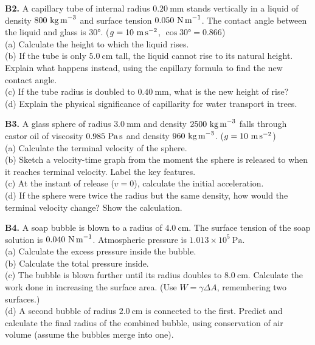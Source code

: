 \begin{exercisebox}[12]
\vspace{0.4cm}

\textbf{B2.} A capillary tube of internal radius
$0.20\ \text{mm}$ stands vertically in a liquid of
density $800\ \text{kg\,m}^{-3}$ and surface tension
$0.050\ \text{N\,m}^{-1}$. The contact angle between
the liquid and glass is $30°$.
($g = 10\ \text{m\,s}^{-2}$, $\cos 30° = 0.866$)\\[4pt]
(a) Calculate the height to which the liquid rises.\\
(b) If the tube is only $5.0\ \text{cm}$ tall, the
liquid cannot rise to its natural height. Explain
what happens instead, using the capillary formula
to find the new contact angle.\\
(c) If the tube radius is doubled to $0.40\ \text{mm}$,
what is the new height of rise?\\
(d) Explain the physical significance of capillarity
for water transport in trees.
\hfill{}

\vspace{0.4cm}

\textbf{B3.} A glass sphere of radius $3.0\ \text{mm}$
and density $2500\ \text{kg\,m}^{-3}$ falls through
castor oil of viscosity $0.985\ \text{Pa\,s}$ and
density $960\ \text{kg\,m}^{-3}$.
($g = 10\ \text{m\,s}^{-2}$)\\[4pt]
(a) Calculate the terminal velocity of the sphere.\\
(b) Sketch a velocity-time graph from the moment the
sphere is released to when it reaches terminal velocity.
Label the key features.\\
(c) At the instant of release ($v = 0$), calculate
the initial acceleration.\\
(d) If the sphere were twice the radius but the same
density, how would the terminal velocity change?
Show the calculation.
\hfill{}

\vspace{0.4cm}

\textbf{B4.} A soap bubble is blown to a radius of
$4.0\ \text{cm}$. The surface tension of the soap
solution is $0.040\ \text{N\,m}^{-1}$.
Atmospheric pressure is $1.013\times10^5\ \text{Pa}$.\\[4pt]
(a) Calculate the excess pressure inside the bubble.\\
(b) Calculate the total pressure inside.\\
(c) The bubble is blown further until its radius
doubles to $8.0\ \text{cm}$. Calculate the work done
in increasing the surface area. (Use $W = \gamma\Delta A$,
remembering two surfaces.)\\
(d) A second bubble of radius $2.0\ \text{cm}$ is
connected to the first. Predict and calculate the
final radius of the combined bubble, using conservation
of air volume (assume the bubbles merge into one).
\hfill{}


\end{exercisebox}
